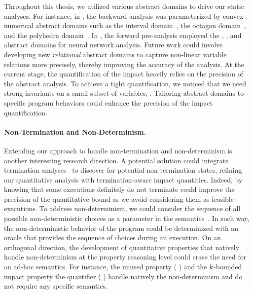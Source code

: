 Throughout this thesis, we utilized various abstract domains to drive our static analyses.
For instance, in , the backward analysis was parameterized by convex numerical abstract domains such as the interval domain~, the octagon domain~, and the polyhedra domain~\cite{Cousot1978}.
In , the forward pre-analysis employed the \symbolic{} \cite{Wang2018b}, \deeppoly{} \cite{Singh2019}, and \neurify{} \cite{Wang2018a} abstract domains for neural network analysis.
Future work could involve developing new \emph{relational} abstract domains to capture non-linear variable relations more precisely, thereby improving the accuracy of the analysis.
At the current stage, the quantification of the impact heavily relies on the precision of the abstract analysis.
To achieve a tight quantification, we noticed that we need strong invariants on a small subset of variables, \cf{} .
Tailoring abstract domains to specific program behaviors could enhance the precision of the impact quantification.

\paragraph{Non-Termination and Non-Determinism.}
Extending our approach to handle non-termination and non-determinism is another interesting research direction.
A potential solution could integrate termination analyses~ to discover for potential non-termination states, refining our quantitative analysis with termination-aware impact quantities.
Indeed, by knowing that some executions definitely do not terminate could improve the precision of the quantitative bound as we avoid considering them as feasible executions.
To address non-determinism, we could consider the sequence of all possible non-deterministic choices as a parameter in the semantics~.
In such way, the non-deterministic behavior of the program could be determinized with an oracle that provides the sequence of choices during an execution.
On an orthogonal direction, the development of quantitative properties that natively handle non-determinism at the property reasoning level could erase the need for an ad-hoc semantics.
For instance, the unused property (\cf{} ) and the $k$-bounded impact property \wrt{} the \qusedname{}
quantifier (\cf{} ) handle natively the non-determinism and do not require any specific semantics.

